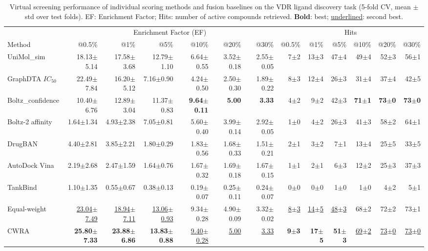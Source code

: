 \begin{table}[htbp!]
\centering
\caption{Virtual screening performance of individual scoring methods and fusion baselines on the VDR ligand discovery task (5-fold CV, mean $\pm$ std over test folds). EF: Enrichment Factor; Hits: number of active compounds retrieved. \textbf{Bold}: best; \underline{underlined}: second best.}
\label{tab:fusion_performance}
\small
\begin{tabular}{lrrrrrr|rrrrrr}
\toprule
& \multicolumn{6}{c|}{Enrichment Factor (EF)} & \multicolumn{6}{c}{Hits} \\
Method & @0.5\% & @1\% & @5\% & @10\% & @20\% & @30\% & @0.5\% & @1\% & @5\% & @10\% & @20\% & @30\% \\
\midrule
UniMol_sim & 18.13$\pm$5.14 & 17.58$\pm$3.68 & 12.79$\pm$1.10 & 6.64$\pm$0.55 & 3.52$\pm$0.18 & 2.55$\pm$0.05 & 7$\pm$2 & 13$\pm$3 & 47$\pm$4 & 49$\pm$4 & 52$\pm$3 & 56$\pm$1 \\
GraphDTA $IC_{50}$ & 22.49$\pm$7.84 & 16.20$\pm$5.12 & 7.16$\pm$0.90 & 4.24$\pm$0.50 & 2.50$\pm$0.30 & 1.89$\pm$0.22 & 8$\pm$3 & 12$\pm$4 & 26$\pm$3 & 31$\pm$4 & 37$\pm$4 & 42$\pm$5 \\
Boltz_confidence & 10.40$\pm$6.76 & 12.89$\pm$3.04 & 11.37$\pm$0.83 & \textbf{9.64$\pm$0.11} & \textbf{5.00} & \textbf{3.33} & 4$\pm$2 & 9$\pm$2 & 42$\pm$3 & \textbf{71$\pm$1} & \textbf{73$\pm$0} & \textbf{73$\pm$0} \\
Boltz-2 affinity & 1.64$\pm$1.34 & 4.93$\pm$2.38 & 7.05$\pm$0.81 & 5.60$\pm$0.40 & 3.99$\pm$0.14 & 2.92$\pm$0.05 & 1$\pm$0 & 4$\pm$2 & 26$\pm$3 & 41$\pm$3 & 58$\pm$2 & 64$\pm$1 \\
DrugBAN & 4.40$\pm$2.81 & 3.85$\pm$2.21 & 1.80$\pm$0.29 & 1.83$\pm$0.56 & 1.68$\pm$0.33 & 1.51$\pm$0.21 & 2$\pm$1 & 3$\pm$2 & 7$\pm$1 & 13$\pm$4 & 25$\pm$5 & 33$\pm$5 \\
AutoDock Vina & 2.19$\pm$2.68 & 2.47$\pm$1.59 & 1.64$\pm$0.76 & 1.67$\pm$0.32 & 1.69$\pm$0.18 & 1.67$\pm$0.15 & 1$\pm$1 & 2$\pm$1 & 6$\pm$3 & 12$\pm$2 & 25$\pm$3 & 37$\pm$3 \\
TankBind & 1.10$\pm$1.35 & 0.55$\pm$0.67 & 0.38$\pm$0.13 & 0.19$\pm$0.07 & 0.25$\pm$0.11 & 0.24$\pm$0.07 & 0$\pm$0 & 0$\pm$0 & 1$\pm$0 & 1$\pm$0 & 4$\pm$2 & 5$\pm$1 \\
\midrule
Equal-weight & \underline{23.04$\pm$7.49} & \underline{18.94$\pm$7.11} & \underline{13.06$\pm$0.93} & 9.34$\pm$0.28 & 4.90$\pm$0.09 & 3.32$\pm$0.02 & \underline{8$\pm$3} & \underline{14$\pm$5} & \underline{48$\pm$3} & 68$\pm$2 & 72$\pm$2 & 73$\pm$1 \\
CWRA & \textbf{25.80$\pm$7.33} & \textbf{23.88$\pm$6.86} & \textbf{13.83$\pm$0.88} & \underline{9.40$\pm$0.28} & \underline{5.00} & \underline{3.33} & \textbf{9$\pm$3} & \textbf{17$\pm$5} & \textbf{51$\pm$3} & \underline{69$\pm$2} & \underline{73$\pm$0} & \underline{73$\pm$0} \\
\bottomrule
\end{tabular}
\end{table}
